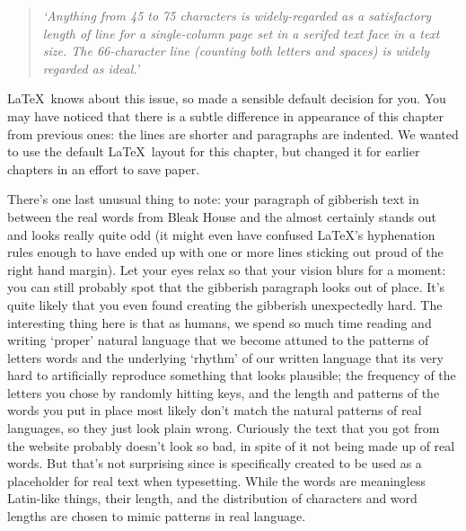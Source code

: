 \begin{refsection}
\begin{quote}
\emph{
`Anything from 45 to 75 characters is widely-regarded as a satisfactory length of line for a single-column page set in a serifed text face in a text size. The 66-character line (counting both letters and spaces) is widely regarded as ideal.'}
\end{quote}

\LaTeX\ knows about this issue, so made a sensible default decision for you. You may have noticed that there is a subtle difference in appearance of this chapter from previous ones: the lines are shorter and paragraphs are indented. We wanted to use the default \LaTeX\ layout for this chapter, but changed it for earlier chapters in an effort to save paper.

There's one last unusual thing to note: your paragraph of gibberish text in between the real words from Bleak House and the  almost certainly stands out and looks really quite odd (it might even have confused \LaTeX's hyphenation rules enough to have ended up with one or more lines sticking out proud of the right hand margin).  Let your eyes relax so that your vision blurs for a moment: you can still probably spot that the gibberish paragraph looks out of place. It's quite likely that you even found creating the gibberish unexpectedly hard. The interesting thing here is that as humans, we spend so much time reading and writing `proper' natural language that we become attuned to the patterns of letters words and the underlying `rhythm' of our written language that its very hard to artificially reproduce something that looks plausible; the frequency of the letters you chose by randomly hitting keys, and the length and patterns of the words you put in place most likely don't match the natural patterns of real languages, so they just look plain wrong.  Curiously the  text that you got from the website probably doesn't look so bad, in spite of it not being made up of real words. But that's not surprising since  is specifically created to be used as a placeholder for real text when typesetting. While the words are meaningless Latin-like things, their length, and the distribution of characters and word lengths are chosen to mimic patterns in real language.



\end{refsection}
